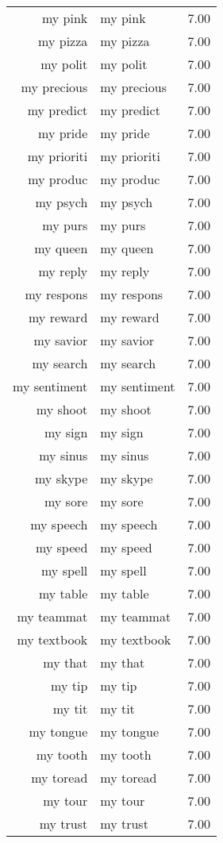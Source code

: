 \begin{table}[ht]
\begin{tabular}{rlr}
  my pink & my pink & 7.00 \\ 
  my pizza & my pizza & 7.00 \\ 
  my polit & my polit & 7.00 \\ 
  my precious & my precious & 7.00 \\ 
  my predict & my predict & 7.00 \\ 
  my pride & my pride & 7.00 \\ 
  my prioriti & my prioriti & 7.00 \\ 
  my produc & my produc & 7.00 \\ 
  my psych & my psych & 7.00 \\ 
  my purs & my purs & 7.00 \\ 
  my queen & my queen & 7.00 \\ 
  my reply & my reply & 7.00 \\ 
  my respons & my respons & 7.00 \\ 
  my reward & my reward & 7.00 \\ 
  my savior & my savior & 7.00 \\ 
  my search & my search & 7.00 \\ 
  my sentiment & my sentiment & 7.00 \\ 
  my shoot & my shoot & 7.00 \\ 
  my sign & my sign & 7.00 \\ 
  my sinus & my sinus & 7.00 \\ 
  my skype & my skype & 7.00 \\ 
  my sore & my sore & 7.00 \\ 
  my speech & my speech & 7.00 \\ 
  my speed & my speed & 7.00 \\ 
  my spell & my spell & 7.00 \\ 
  my table & my table & 7.00 \\ 
  my teammat & my teammat & 7.00 \\ 
  my textbook & my textbook & 7.00 \\ 
  my that & my that & 7.00 \\ 
  my tip & my tip & 7.00 \\ 
  my tit & my tit & 7.00 \\ 
  my tongue & my tongue & 7.00 \\ 
  my tooth & my tooth & 7.00 \\ 
  my toread & my toread & 7.00 \\ 
  my tour & my tour & 7.00 \\ 
  my trust & my trust & 7.00 \\ 

\end{tabular}
\end{table}
